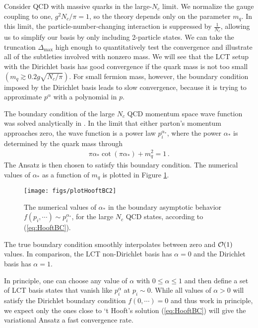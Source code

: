 \documentclass[12pt]{article}
\newcommand{\CO}{{\cal O}}
\newcommand\De\Delta
\newcommand{\Dmax}{\De_{\max}}
\newcommand{\Nc}{N_c}
\begin{document}
Consider QCD with massive quarks in the large-$\Nc$ limit. We normalize the gauge coupling to one, $g^2 N_c / \pi = 1$, so the theory depends only on the parameter $m_q$. 
In this limit, the particle-number-changing interaction is suppressed by $\frac{1}{\Nc}$,
allowing us to simplify our basis by only including 2-particle states. We can
take the truncation $\Dmax$ high enough to quantitatively test the convergence
and illustrate all of the subtleties involved with nonzero mass. We will see 
that the LCT setup with the Dirichlet basis has good convergence if the quark mass
is not too small $(m_q \gtrsim 0.2 g\sqrt{\Nc/\pi})$. For small fermion mass, however, the 
boundary condition imposed by the Dirichlet basis leads to slow convergence, because it is trying to approximate $p^\alpha$ with a polynomial in $p$.






The boundary condition of the large $\Nc$ QCD momentum space wave function was solved analytically in \cite{t1993two}. In the limit that either parton's momentum approaches zero, the wave function is a power law $p_i^{\alpha_*}$, where the power $\alpha_*$ is determined by the quark mass through
\begin{align}
\label{eq:HooftBC}
 \pi  \alpha_*  \cot \left(\pi  \alpha_*\right)+m_q^2=1 \, .
\end{align}
The Ansatz is then chosen to satisfy this boundary condition. The numerical values of $\alpha_*$ as a function of $m_q$ is plotted in Figure \ref{fig:plotHooftBC}. 
\begin{figure}[htbp]
\centering
\texttt{[image: figs/plotHooftBC2]}
\caption{\label{fig:plotHooftBC} The numerical values of $\alpha_*$ in the boundary asymptotic behavior $f(p_i, \cdots)\sim p_i^{\alpha_*}$, for the large $\Nc$ QCD states, according to (\ref{eq:HooftBC}).  
}
\end{figure}
The true boundary condition smoothly interpolates between zero and $\CO(1)$ values. In comparison, the LCT non-Dirichlet basis has $\alpha=0$ and the Dirichlet basis has $\alpha=1$. 

In principle, one can choose any value of $\alpha$  with $0 \le \alpha \le 1$ and then define a set of LCT basis states that vanish like $p_i^\alpha$ at $p_i \sim 0$.  While all values of $\alpha>0$ will satisfy the Dirichlet boundary condition $f(0,\cdots)=0$ and thus work in principle, we expect only the ones close to `t Hooft's solution (\ref{eq:HooftBC}) will give the variational Ansatz a fast convergence rate. 
\end{document}
